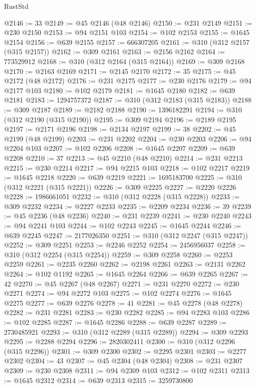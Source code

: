 \begin{lexlean}{RustStd}
\begin{coremodule}
{\begin{coremodule}
{{{{{{{{{{{{{{{{{{{{{{{{{{{{{{{{{{{{{@2146 := 33
@2149 := @45 @2146 (@48 @2146)
@2150 := @231 @2149
@2151 := @230 @2150
@2153 := @94 @2151 @103
@2154 := @102 @2153
@2155 := @1645 @2154
@2156 := @639 @2155
@2157 := 666307205
@2161 := @310 (@312 @2157 (@315 @2157))
@2162 := @309 @2161
@2163 := @2156 @2162
@2164 := 773529912
@2168 := @310 (@312 @2164 (@315 @2164))
@2169 := @309 @2168
@2170 := @2163 @2169
@2171 := @2145 @2170
@2172 := 35
@2175 := @45 @2172 (@48 @2172)
@2176 := @231 @2175
@2177 := @230 @2176
@2179 := @94 @2177 @103
@2180 := @102 @2179
@2181 := @1645 @2180
@2182 := @639 @2181
@2183 := 1294757372
@2187 := @310 (@312 @2183 (@315 @2183))
@2188 := @309 @2187
@2189 := @2182 @2188
@2190 := 1396182291
@2194 := @310 (@312 @2190 (@315 @2190))
@2195 := @309 @2194
@2196 := @2189 @2195
@2197 := @2171 @2196
@2198 := @2134 @2197
@2199 := 38
@2202 := @45 @2199 (@48 @2199)
@2203 := @231 @2202
@2204 := @230 @2203
@2206 := @94 @2204 @103
@2207 := @102 @2206
@2208 := @1645 @2207
@2209 := @639 @2208
@2210 := 37
@2213 := @45 @2210 (@48 @2210)
@2214 := @231 @2213
@2215 := @230 @2214
@2217 := @94 @2215 @103
@2218 := @102 @2217
@2219 := @1645 @2218
@2220 := @639 @2219
@2221 := 1695183700
@2225 := @310 (@312 @2221 (@315 @2221))
@2226 := @309 @2225
@2227 := @2220 @2226
@2228 := 1986661051
@2232 := @310 (@312 @2228 (@315 @2228))
@2233 := @309 @2232
@2234 := @2227 @2233
@2235 := @2209 @2234
@2236 := 39
@2239 := @45 @2236 (@48 @2236)
@2240 := @231 @2239
@2241 := @230 @2240
@2243 := @94 @2241 @103
@2244 := @102 @2243
@2245 := @1645 @2244
@2246 := @639 @2245
@2247 := 2177026350
@2251 := @310 (@312 @2247 (@315 @2247))
@2252 := @309 @2251
@2253 := @2246 @2252
@2254 := 2456956037
@2258 := @310 (@312 @2254 (@315 @2254))
@2259 := @309 @2258
@2260 := @2253 @2259
@2261 := @2235 @2260
@2262 := @2198 @2261
@2263 := @2131 @2262
@2264 := @102 @1192
@2265 := @1645 @2264
@2266 := @639 @2265
@2267 := 42
@2270 := @45 @2267 (@48 @2267)
@2271 := @231 @2270
@2272 := @230 @2271
@2274 := @94 @2272 @103
@2275 := @102 @2274
@2276 := @1645 @2275
@2277 := @639 @2276
@2278 := 41
@2281 := @45 @2278 (@48 @2278)
@2282 := @231 @2281
@2283 := @230 @2282
@2285 := @94 @2283 @103
@2286 := @102 @2285
@2287 := @1645 @2286
@2288 := @639 @2287
@2289 := 2730485921
@2293 := @310 (@312 @2289 (@315 @2289))
@2294 := @309 @2293
@2295 := @2288 @2294
@2296 := 2820302411
@2300 := @310 (@312 @2296 (@315 @2296))
@2301 := @309 @2300
@2302 := @2295 @2301
@2303 := @2277 @2302
@2304 := 43
@2307 := @45 @2304 (@48 @2304)
@2308 := @231 @2307
@2309 := @230 @2308
@2311 := @94 @2309 @103
@2312 := @102 @2311
@2313 := @1645 @2312
@2314 := @639 @2313
@2315 := 3259730800
}}}}}}}}}}}}}}}}}}}}}}}}}}}}}}}}}}}}}
\end{coremodule}}
\end{coremodule}
\end{lexlean}
